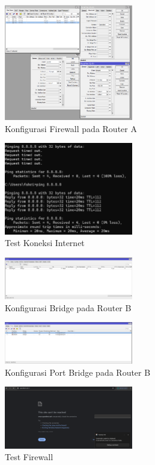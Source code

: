 \begin{figure}[h]
    \centering
    \includegraphics[width=0.5\textwidth]{dokum/filter rule r1.png}
    \caption{Konfigurasi Firewall pada Router A}
    \label{fig:firewall-ra}
\end{figure}

\begin{figure}[h]
    \centering
    \includegraphics[width=0.5\textwidth]{dokum/R2/test koneksi.png}
    \caption{Test Koneksi Internet}
    \label{fig:ping-rb}
\end{figure}
\begin{figure}[h]
    \centering
    \includegraphics[width=0.5\textwidth]{dokum/R2/bridge.png}
    \caption{Konfigurasi Bridge pada Router B}
    \label{fig:bridge-rb}
\end{figure}
\begin{figure}[h]
    \centering
    \includegraphics[width=0.5\textwidth]{dokum/R2/bridge port.png}
    \caption{Konfigurasi Port Bridge pada Router B}
    \label{fig:bridgeport-rb}
\end{figure}
\begin{figure}[h]
    \centering
    \includegraphics[width=0.5\textwidth]{dokum/R2/test firewall.png}
    \caption{Test Firewall}
    \label{fig:test-firewall}
\end{figure}

